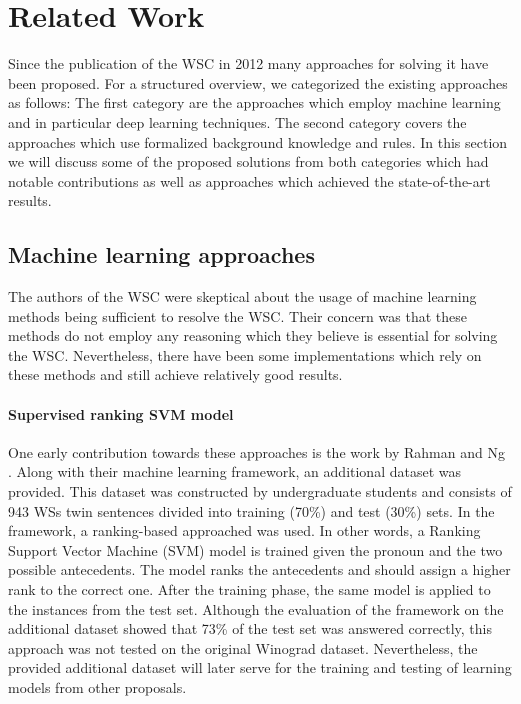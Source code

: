 \section{Related Work}
\label{section:TheDifferentApproaches}

Since the publication of the WSC in 2012 many approaches for solving it have been proposed. For a structured overview, we categorized the existing approaches as follows: The first category are the approaches which employ machine learning and in particular deep learning techniques. 
The second category covers the approaches which use formalized background knowledge and rules. 
In this section we will discuss some of the proposed solutions from both categories which had notable contributions as well as approaches which achieved the state-of-the-art results.

\begin{comment}
Main challenge for rule base systems: how to obtain non-domain specific knowledge base; how to reason on top of that; if predefined as Peter's too constraint

Main challenge for ML approaches: not enough reasoning, it's learning statistic, with small changes would fail
Good approach: knowledge hunting frameworks; maybe recognizing different subsets of sentences
\end{comment}

\subsection{Machine learning approaches}
The authors of the WSC were skeptical about the usage of machine learning methods being sufficient to resolve the WSC. Their concern was that these methods do not employ any reasoning which they believe is essential for solving the WSC. 
Nevertheless, there have been some implementations which rely on these methods and still achieve relatively good results. 

\paragraph{Supervised ranking SVM model}
One early contribution towards these approaches is the work by Rahman and Ng \cite{DBLP:conf/emnlp/RahmanN12}. Along with their machine learning framework, an additional dataset was provided. This dataset was constructed by undergraduate students and consists of 943 WSs twin sentences divided into training (70\%) and test (30\%) sets. In the framework, a ranking-based approached was used. In other words, a Ranking Support Vector Machine (SVM) model \cite{DBLP:conf/kdd/Joachims02} is trained given the pronoun and the two possible antecedents. The model ranks the antecedents and should assign a higher rank to the correct one. After the training phase, the same model is applied to the instances from the test set. Although the evaluation of the framework on the additional dataset showed that 73\% of the test set was answered correctly, this approach was not tested on the original Winograd dataset.  Nevertheless, the provided additional dataset will later serve for the training and testing of learning models from other proposals. 

